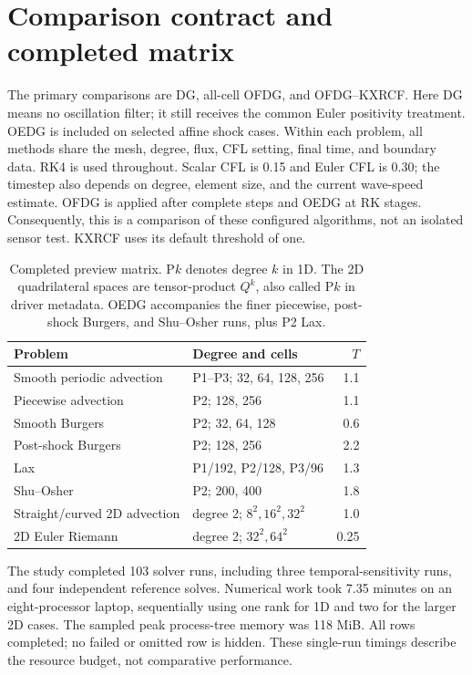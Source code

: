 \section{Comparison contract and completed matrix}
\label{sec:experimental-methodology}
The primary comparisons are DG, all-cell OFDG, and OFDG--KXRCF. Here DG means
no oscillation filter; it still receives the common Euler positivity treatment.
OEDG is included on selected affine shock cases. Within each problem, all
methods share the mesh, degree, flux, CFL setting, final time, and boundary data.
RK4 is used throughout. Scalar CFL is 0.15 and Euler CFL is 0.30; the timestep
also depends on degree, element size, and the current wave-speed estimate.
OFDG is applied after complete steps and OEDG at RK stages. Consequently, this
is a comparison of these configured algorithms, not an isolated sensor test.
KXRCF uses its default threshold of one.

\begin{table}[htbp]
\centering\small
\begin{tabular}{@{}p{}p{}r@{}}
\toprule Problem & Degree and cells & $T$\\\midrule
Smooth periodic advection & P1--P3; 32, 64, 128, 256 & 1.1\\
Piecewise advection & P2; 128, 256 & 1.1\\
Smooth Burgers & P2; 32, 64, 128 & 0.6\\
Post-shock Burgers & P2; 128, 256 & 2.2\\
Lax & P1/192, P2/128, P3/96 & 1.3\\
Shu--Osher & P2; 200, 400 & 1.8\\
Straight/curved 2D advection & degree 2; $8^2,16^2,32^2$ & 1.0\\
2D Euler Riemann & degree 2; $32^2,64^2$ & 0.25\\\bottomrule
\end{tabular}
\caption{Completed preview matrix. P$k$ denotes degree $k$ in 1D. The 2D
quadrilateral spaces are tensor-product $Q^k$, also called P$k$ in driver
metadata. OEDG accompanies the finer piecewise, post-shock Burgers, and
Shu--Osher runs, plus P2 Lax.}
\label{tab:preview-matrix}
\end{table}

The study completed 103 solver runs, including three temporal-sensitivity runs,
and four independent reference solves. Numerical work took 7.35 minutes on an
eight-processor laptop, sequentially using one rank for 1D and two for the
larger 2D cases. The sampled peak process-tree memory was 118 MiB. All rows
completed; no failed or omitted row is hidden. These single-run timings describe
the resource budget, not comparative performance.

